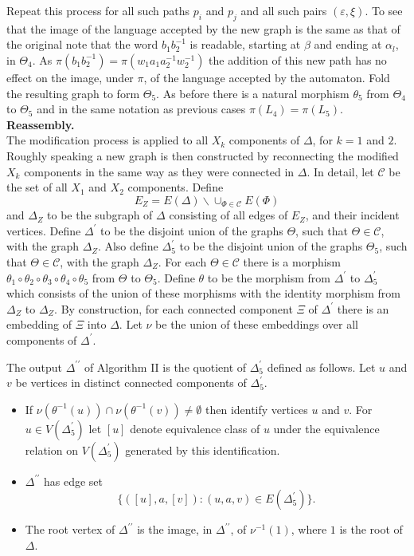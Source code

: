 \documentclass[a4paper,12pt]{article}
\renewcommand{\a}{\alpha }
\renewcommand{\b}{\beta }
\newcommand{\D}{\Delta }
\newcommand{\e}{\varepsilon }
\newcommand{\T}{\Theta }
\newcommand{\nul}{\emptyset }
\numberwithin{equation}{section}
\numberwithin{figure}{section}
\newcommand{\cC}{\mathcal{C}}
\newcommand{\bs}{\backslash}
\begin{document}
Repeat this process for all such paths $p_i$ and $p_j$ and all such
pairs $(\e,\xi)$.
To see that the image of the language accepted by
 the new graph is the same as that of the original note
that the word $b_1b_2^{-1}$ is readable, starting at $\b$ and
ending at $\a_l$, in $\T_4$. As $\pi(b_1b_2^{-1})=\pi(w_1a_1a_2^{-1}w_2^{-1})$
the addition of this new path has no effect on the image, under $\pi$, of
the language accepted by the automaton.
 Fold the resulting graph to form $\T_5$. As before there is a natural
morphism $\theta_5$ from $\T_4$ to $\T_5$ and in the same notation
as previous cases $\pi(L_4)=\pi(L_5)$.\\[1em]

\noindent\textbf{Reassembly.}\\
The modification process is applied to all $X_k$ components of $\D$,
for $k=1$ and $2$. Roughly speaking a new graph is then constructed by
reconnecting the modified $X_k$ components in the same way as they
were connected in $\D$. In detail,
let $\cC$ be the set of all
$X_1$ and $X_2$ components.
Define
\[E_Z=E(\D)\bs \cup_{\Phi\in \cC} E(\Phi)\]
and $\D_Z$ to be the subgraph of $\D$ consisting of all edges
of $E_Z$, and their incident vertices.
Define $\D^\prime$ to be the disjoint union of the
 graphs $\T$, such that $\T\in \cC$, with  the graph $\D_Z$.
Also define $\D^{\prime}_5$ to be the disjoint union of the graphs
$\T_5$, such that $\T\in \cC$, with the graph $\D_Z$. For each
$\T\in \cC$ there is  a morphism
$\theta_1\circ\theta_2\circ\theta_3\circ\theta_4\circ\theta_5$
from $\T$ to $\T_5$. Define $\theta$ to be the morphism from
$\D^\prime$ to $\D^\prime_5$ which consists of the union of these
morphisms with the identity morphism from $\D_Z$ to $\D_Z$. By
construction, for each connected component $\Xi$ of $\D^\prime$
there is an embedding of $\Xi$ into $\D$. Let $\nu$ be the union
of these embeddings over all components of $\D^\prime$.

The output $\D^{\prime\prime}$  of Algorithm II is the quotient of
 $\D^\prime_5$ defined as follows.
Let $u$ and $v$ be vertices in
distinct connected components of $\D^\prime_5$.
\begin{itemize}
\item If $\nu(\theta^{-1}(u))\cap \nu(\theta^{-1}(v))\neq \nul$ then
identify vertices $u$ and $v$. 
For $u \in V(\D^\prime_5)$ let
$[u]$  denote equivalence class of $u$ under the equivalence relation
on $V(\D^\prime_5)$ generated by this identification.
\item 
$\D^{\prime\prime}$ has edge set 
\[\{([u],a,[v]): (u,a,v)\in E(\D^\prime_5)\}.\]
\item The root vertex of $\D^{\prime\prime}$ is the image, in
$\D^{\prime\prime}$, of $\nu^{-1}(1)$, where $1$ is  the root of
$\D$. 
\end{itemize}
\end{document}
